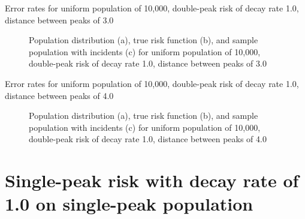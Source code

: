 \graphicspath{{./results/unif_100_1_2h_3/}}
\makeatletter
{}
\makeatother

\begin{table}[H]
    
    \caption[]{Error rates for uniform population of 10,000, double-peak risk of decay rate 1.0, distance between peaks of 3.0}
    \label{tab:mean_error_rates:unif_100_1_2h_3}
\end{table}

\begin{figure}[H]
    
    \caption[]{Population distribution (a), true risk function (b), and sample population with incidents (c) for uniform population of 10,000, double-peak risk of decay rate 1.0, distance between peaks of 3.0}
    \label{fig:distributions:unif_100_1_2h_3}    
\end{figure}

\graphicspath{{./results/unif_100_1_2h_4/}}
\makeatletter
{}
\makeatother

\begin{table}[H]
    
    \caption[]{Error rates for uniform population of 10,000, double-peak risk of decay rate 1.0, distance between peaks of 4.0}
    \label{tab:mean_error_rates:unif_100_1_2h_4}
\end{table}

\begin{figure}[H]
    
    \caption[]{Population distribution (a), true risk function (b), and sample population with incidents (c) for uniform population of 10,000, double-peak risk of decay rate 1.0, distance between peaks of 4.0}
    \label{fig:distributions:unif_100_1_2h_4}    
\end{figure}

\section{Single-peak risk with decay rate of 1.0 on single-peak population}
\label{sec:app:results_p1.4_100_1_1h_X}

